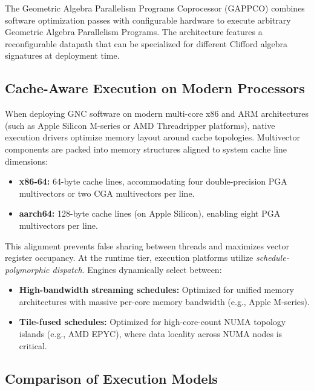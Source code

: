 \documentclass[manuscript, nonacm, review=false]{acmart}
\theoremstyle{definition}
\theoremstyle{plain}
\begin{document}
The Geometric Algebra Parallelism Programs Coprocessor (GAPPCO) combines software optimization passes with configurable hardware to execute arbitrary Geometric Algebra Parallelism Programs. The architecture features a reconfigurable datapath that can be specialized for different Clifford algebra signatures at deployment time.


\subsection{Cache-Aware Execution on Modern Processors}
\label{subsec:cache_aware}

When deploying GNC software on modern multi-core x86 and ARM architectures (such as Apple Silicon M-series or AMD Threadripper platforms), native execution drivers optimize memory layout around cache topologies. Multivector components are packed into memory structures aligned to system cache line dimensions:

\begin{itemize}
    \item \textbf{x86-64:} 64-byte cache lines, accommodating four double-precision PGA multivectors or two CGA multivectors per line.
    \item \textbf{aarch64:} 128-byte cache lines (on Apple Silicon), enabling eight PGA multivectors per line.
\end{itemize}

This alignment prevents false sharing between threads and maximizes vector register occupancy. At the runtime tier, execution platforms utilize \emph{schedule-polymorphic dispatch}. Engines dynamically select between:

\begin{itemize}
    \item \textbf{High-bandwidth streaming schedules:} Optimized for unified memory architectures with massive per-core memory bandwidth (e.g., Apple M-series).
    \item \textbf{Tile-fused schedules:} Optimized for high-core-count NUMA topology islands (e.g., AMD EPYC), where data locality across NUMA nodes is critical.
\end{itemize}

\subsection{Comparison of Execution Models}
\label{subsec:execution_comparison}
\end{document}
